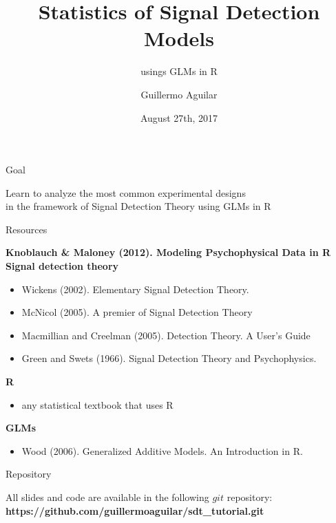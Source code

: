 \documentclass[10pt]{beamer}
\title
{Statistics of Signal Detection Models}
\subtitle{usings GLMs in R} %
\author{Guillermo Aguilar}
\institute[TU Berlin] %
{Technische Universit\"at Berlin}
\date[ECVP 2017]{August 27th, 2017}
\begin{document}
\begin{frame}
  \titlepage
\end{frame}

\begin{frame}{Goal}
\begin{center}
Learn to analyze the most common experimental designs \\
in the framework of Signal Detection Theory using GLMs  in R
\end{center}
\end{frame}

\begin{frame}
\tableofcontents
\end{frame}

\begin{frame}{Resources}

\textbf{Knoblauch \& Maloney (2012). Modeling Psychophysical Data in R}\\
\vspace{10pt}
\textbf{Signal detection theory}
\begin{itemize}
\item Wickens (2002). Elementary Signal Detection Theory.
\item McNicol (2005). A premier of Signal Detection Theory
\item Macmillian and Creelman (2005). Detection Theory. A User's Guide
\item Green and Swets (1966). Signal Detection Theory and Psychophysics.
\end{itemize}
\vspace{10pt}
\textbf{R}
\begin{itemize}
\item any statistical textbook that uses R
\end{itemize}
\vspace{10pt}
\textbf{GLMs}
\begin{itemize}
\item Wood (2006). Generalized Additive Models. An Introduction in R.
\end{itemize}

\end{frame}


\begin{frame}{Repository}

All slides and code are available in the following $git$ repository:\\[10pt]

\textbf{https://github.com/guillermoaguilar/sdt\_tutorial.git
}
\end{frame}
\end{document}
